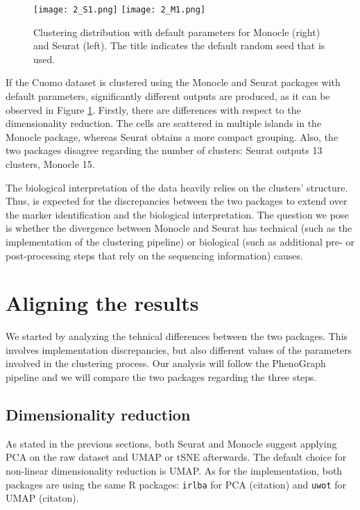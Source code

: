 \begin{figure}[H]
    \centering
    \texttt{[image: 2\_S1.png]}
    \texttt{[image: 2\_M1.png]}
    \caption{\label{fig:s4-m3-default}Clustering distribution with default parameters for Monocle (right) and Seurat (left). The title indicates the default random seed that is used.}
\end{figure}

If the Cuomo \cite{Cuomo2020} dataset is clustered using the Monocle and Seurat packages with default parameters, significantly different outputs are produced, as it can be observed in Figure \ref{fig:s4-m3-default}. Firstly, there are differences with respect to the dimensionality reduction. The cells are scattered in multiple islands in the Monocle package, whereas Seurat obtains a more compact grouping. Also, the two packages disagree regarding the number of clusters: Seurat outputs 13 clusters, Monocle 15.

The biological interpretation of the data heavily relies on the clusters' structure. Thus, is expected for the discrepancies between the two packages to extend over the marker identification and the biological interpretation. The question we pose is whether the divergence between Monocle and Seurat has technical (such as the implementation of the clustering pipeline) or biological (such as additional pre- or post-processing steps that rely on the sequencing information) causes.

\section{Aligning the results}
We started by analyzing the tehnical differences between the two packages. This involves implementation discrepancies, but also different values of the parameters involved in the clustering process. Our analysis will follow the PhenoGraph pipeline and we will compare the two packages regarding the three steps.

\subsection{Dimensionality reduction}
As stated in the previous sections, both Seurat and Monocle suggest applying PCA on the raw dataset and UMAP or tSNE afterwards. The default choice for non-linear dimensionality reduction is UMAP. As for the implementation, both packages are using the same R packages: \verb|irlba| for PCA (citation) and \verb|uwot| for UMAP (citaton).


